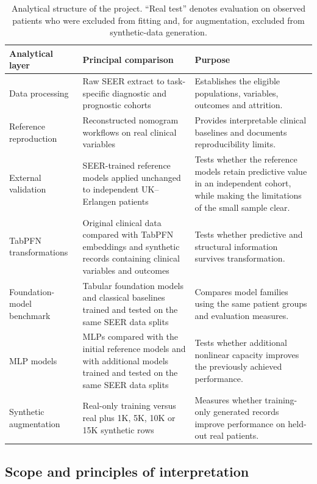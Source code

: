 \begin{table}[htbp]
\centering
\caption{Analytical structure of the project. ``Real test'' denotes evaluation
on observed patients who were excluded from fitting and, for augmentation,
excluded from synthetic-data generation.}
\label{tab:introduction:architecture}
\small
\begin{tabularx}{\textwidth}{@{}>{\RaggedRight\arraybackslash}p{}YY@{}}
\toprule
\textbf{Analytical layer} & \textbf{Principal comparison} & \textbf{Purpose} \\
\midrule
Data processing
  & Raw SEER extract to task-specific diagnostic and prognostic cohorts
  & Establishes the eligible populations, variables, outcomes and attrition. \\
Reference reproduction
  & Reconstructed nomogram workflows on real clinical variables
  & Provides interpretable clinical baselines and documents reproducibility limits. \\
External validation
  & SEER-trained reference models applied unchanged to independent UK--Erlangen patients
  & Tests whether the reference models retain predictive value in an independent cohort, while making the limitations of the small sample clear. \\
TabPFN transformations
  & Original clinical data compared with TabPFN embeddings and synthetic records containing clinical variables and outcomes
  & Tests whether predictive and structural information survives transformation. \\
Foundation-model benchmark
  & Tabular foundation models and classical baselines trained and tested on the same SEER data splits
  & Compares model families using the same patient groups and evaluation measures. \\
MLP models
  & MLPs compared with the initial reference models and with additional models trained and tested on the same SEER data splits
  & Tests whether additional nonlinear capacity improves the previously achieved performance. \\
Synthetic augmentation
  & Real-only training versus real plus 1K, 5K, 10K or 15K synthetic rows
  & Measures whether training-only generated records improve performance on held-out real patients. \\
\bottomrule
\end{tabularx}
\end{table}
\FloatBarrier

\subsection{Scope and principles of interpretation}
\label{sec:introduction:scope}

